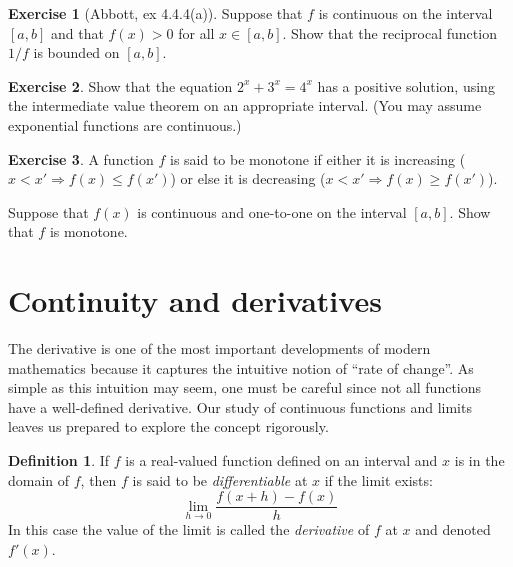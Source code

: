 \documentclass[11pt,oneside]{amsbook}
\newcommand{\N}{\mathbb N}
\theoremstyle{definition}
\newtheorem{exerc}{Exercise}[section]
\theoremstyle{plain}
\theoremstyle{definition}
\newtheorem{definition}[theorem]{Definition}
\theoremstyle{remark}
\numberwithin{equation}{section}
\numberwithin{figure}{section}
\begin{document}

\begin{exerc}[Abbott, ex 4.4.4(a)]
  Suppose that $f$ is continuous on the interval $[a,b]$ and that $f(x)>0$ for all $x\in[a,b]$.  Show that the reciprocal function $1/f$ is bounded on $[a,b]$.
\end{exerc}

\begin{exerc}
  Show that the equation $2^x+3^x=4^x$ has a positive solution, using the intermediate value theorem on an appropriate interval. (You may assume exponential functions are continuous.)
\end{exerc}

\begin{exerc}
  A function $f$ is said to be monotone if either it is increasing ($x<x'\Rightarrow f(x)\leq f(x')$) or else it is decreasing ($x<x'\Rightarrow f(x)\geq f(x')$).

  Suppose that $f(x)$ is continuous and one-to-one on the interval $[a,b]$. Show that $f$ is monotone.
\end{exerc}



\newpage
\section{Continuity and derivatives}

The derivative is one of the most important developments of modern mathematics because it captures the intuitive notion of ``rate of change''. As simple as this intuition may seem, one must be careful since not all functions have a well-defined derivative. Our study of continuous functions and limits leaves us prepared to explore the concept rigorously.

\begin{definition}
If $f$ is a real-valued function defined on an interval and $x$ is in the domain of $f$, then $f$ is said to be \emph{differentiable} at $x$ if the limit exists:
\[\lim_{h\to0}\frac{f(x+h)-f(x)}{h}
\]
In this case the value of the limit is called the \emph{derivative} of $f$ at $x$ and denoted $f'(x)$.
\end{definition}
\end{document}
